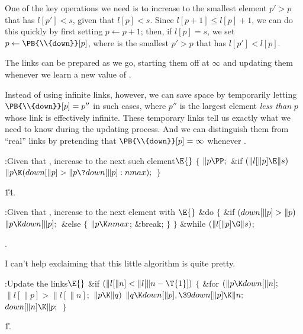 One of the key operations we need is to increase 
to the smallest
element $p'>p$ that has $l[p']<s$, given that $l[p]<s$. Since
$l[p+1]\le l[p]+1$, we can do this quickly by first setting $p\gets p+1$;
then, if $l[p]=s$, we set $p\gets\PB{\\{down}}[p]$, where  is
the
smallest $p'>p$ that has $l[p']<l[p]$.

The links  can be prepared as we go, starting them off at $%
\infty$
and updating them whenever we learn a new value of .

Instead of using infinite links, however, we can save space by
temporarily letting $\PB{\\{down}}[p]=p''$ in such cases, where $p''$ is the
largest element {\it less than\/} $p$ whose  link is effectively
infinite. These temporary links tell us exactly what we need to know during
the updating process. And we can distinguish them from ``real'' 
links by pretending that $\PB{\\{down}}[p]=\infty$ whenever .

\Y\B\4:Given that , increase  to the next such
element\X${}\E{}$\6
${}\{{}$\1\6
${}\|p\PP;{}$\6
\&{if} ${}(\|l[\|p]\E\|s){}$\1\5
${}\|p\K(\\{down}[\|p]>\|p\?\\{down}[\|p]:\\{nmax});{}$\2\6
\4${}\}{}$\2\par
\U14.\fi

\B{}:Given that , increase 
to the next element with \X${}\E{}$\6
\&{do}\5
${}\{{}$\1\6
\&{if} ${}(\\{down}[\|p]>\|p){}$\1\5
${}\|p\K\\{down}[\|p];{}$\2\6
\&{else}\5
${}\{{}$\1\6
${}\|p\K\\{nmax}{}$;\5
\&{break};\6
\4${}\}{}$\2\6
\4${}\}{}$\5
\2\5
\&{while} ${}(\|l[\|p]\G\|s){}$;\par
{}.\fi

I can't help exclaiming that this little algorithm is
quite pretty.

\Y\B\4:Update the  links\X${}\E{}$\6
\&{if} ${}(\|l[\|n]<\|l[\|n-\T{1}]){}$\5
${}\{{}$\1\6
\&{for} ${}(\|p\K\\{down}[\|n];{}$ ${}\|l[\|p]>\|l[\|n];{}$ ${}\|p\K\|q){}$\1\5
${}\|q\K\\{down}[\|p],\39\\{down}[\|p]\K\|n;{}$\2\6
${}\\{down}[\|n]\K\|p;{}$\6
\4${}\}{}$\2\par
\U1.\fi

